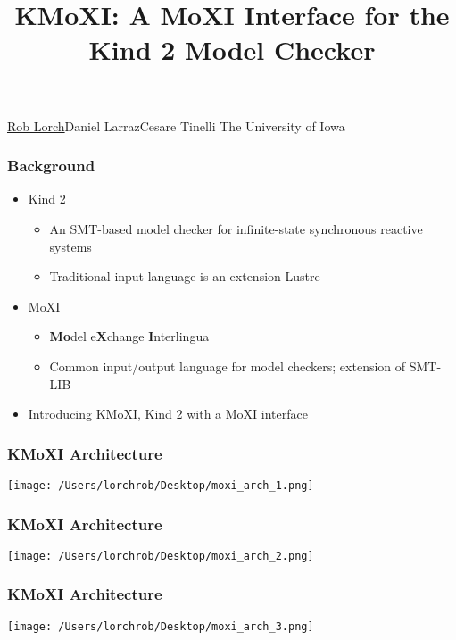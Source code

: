 \documentclass[11pt,xcolor={dvipsnames},hyperref={pdftex,pdfpagemode=UseNone,hidelinks,pdfdisplaydoctitle=true},usepdftitle=false]{beamer}
\begin{document}

\title{KMoXI: A MoXI Interface for the Kind 2 Model Checker}

\information
%  
%
{\underline{Rob Lorch}\quad Daniel Larraz\quad Cesare Tinelli
\newline \newline   
The University of Iowa
}
%

\frame{\titlepage}

\begin{frame} 
    \frametitle{Background} \pause
    \begin{itemize}
        \item Kind 2
        \begin{itemize}
            \item An SMT-based model checker for infinite-state synchronous reactive systems
            \item Traditional input language is an extension Lustre
        \end{itemize}
        \pause
        \item MoXI
        \begin{itemize}
            \item \textbf{Mo}del e\textbf{X}change \textbf{I}nterlingua
            \item Common input/output language for model checkers; extension of SMT-LIB
        \end{itemize}
        \pause
        \item Introducing KMoXI, Kind 2 with a MoXI interface
    \end{itemize}
\end{frame}

\begin{frame} 
    \frametitle{KMoXI Architecture}\pause
    \texttt{[image: /Users/lorchrob/Desktop/moxi\_arch\_1.png]}
\end{frame}

\begin{frame} 
    \frametitle{KMoXI Architecture}
    \texttt{[image: /Users/lorchrob/Desktop/moxi\_arch\_2.png]}
\end{frame}

\begin{frame} 
    \frametitle{KMoXI Architecture}
    \texttt{[image: /Users/lorchrob/Desktop/moxi\_arch\_3.png]}
\end{frame}
\end{document}
